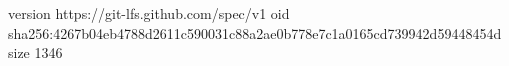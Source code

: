 version https://git-lfs.github.com/spec/v1
oid sha256:4267b04eb4788d2611c590031c88a2ae0b778e7c1a0165cd739942d59448454d
size 1346
